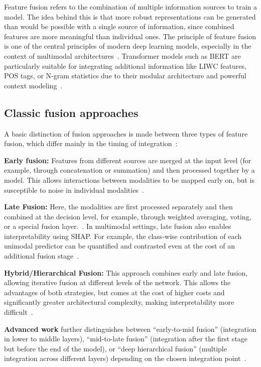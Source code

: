 Feature fusion refers to the combination of multiple information sources to train a model. The idea behind this is that more robust representations can be generated than would be possible with a single source of information, since combined features are more meaningful than individual ones. The principle of feature fusion is one of the central principles of modern deep learning models, especially in the context of multimodal architectures~\parencite{li2024multimodal}. 
Transformer models such as BERT are particularly suitable for integrating additional information like LIWC features, POS tags, or N-gram statistics due to their modular architecture and powerful context modeling~\parencite{nagrani2021attention}.

\subsection{Classic fusion approaches}
A basic distinction of fusion approaches is made between three types of feature fusion, which differ mainly in the timing of integration~\parencite{li2024multimodal, li2024fusionreview}:

\textbf{Early fusion:} Features from different sources are merged at the input level (for example, through concatenation or summation) and then processed together by a model. This allows interactions between modalities to be mapped early on, but is susceptible to noise in individual modalities~\parencite{cai2025multimodal}.

\textbf{Late Fusion:} Here, the modalities are first processed separately and then combined at the decision level, for example, through weighted averaging, voting, or a special fusion layer.~\parencite{sharma2023late}. In multimodal settings, late fusion also enables interpretability using SHAP. For example, the class-wise contribution of each unimodal predictor can be quantified and contrasted even at the cost of an additional fusion stage~\parencite{abdul2024decoding}.

\textbf{Hybrid/Hierarchical Fusion:} This approach combines early and late fusion, allowing iterative fusion at different levels of the network. This allows the advantages of both strategies, but comes at the cost of higher costs and significantly greater architectural complexity, making interpretability more difficult~\parencite{li2024multimodal}.

\textbf{Advanced work} further distinguishes between “early-to-mid fusion” (integration in lower to middle layers), “mid-to-late fusion” (integration after the first stage but before the end of the model), or “deep hierarchical fusion” (multiple integration across different layers) depending on the chosen integration point~\parencite{li2024multimodal}.


